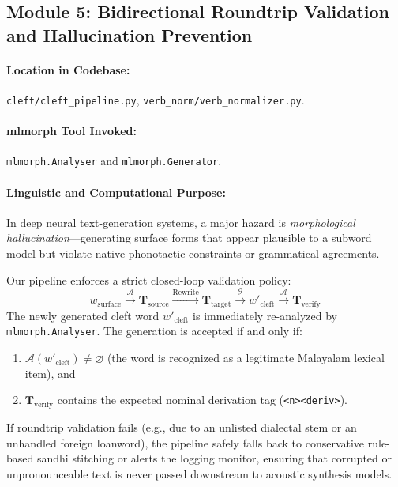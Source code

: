 \subsection{Module 5: Bidirectional Roundtrip Validation and Hallucination Prevention}
\label{subsec:mod5_validation}

\paragraph{Location in Codebase:} \texttt{cleft/cleft\_pipeline.py}, \texttt{verb\_norm/verb\_normalizer.py}.
\paragraph{mlmorph Tool Invoked:} \texttt{mlmorph.Analyser} and \texttt{mlmorph.Generator}.

\paragraph{Linguistic and Computational Purpose:}
In deep neural text-generation systems, a major hazard is \textit{morphological hallucination}—generating surface forms that appear plausible to a subword model but violate native phonotactic constraints or grammatical agreements. 

Our pipeline enforces a strict closed-loop validation policy:
\begin{equation}
    w_{\text{surface}} \xrightarrow{\mathcal{A}} \mathbf{T}_{\text{source}} \xrightarrow{\text{Rewrite}} \mathbf{T}_{\text{target}} \xrightarrow{\mathcal{G}} w'_{\text{cleft}} \xrightarrow{\mathcal{A}} \mathbf{T}_{\text{verify}}
\end{equation}
The newly generated cleft word $w'_{\text{cleft}}$ is immediately re-analyzed by \texttt{mlmorph.Analyser}. The generation is accepted if and only if:
\begin{enumerate}[noitemsep]
    \item $\mathcal{A}(w'_{\text{cleft}}) \neq \varnothing$ (the word is recognized as a legitimate Malayalam lexical item), and
    \item $\mathbf{T}_{\text{verify}}$ contains the expected nominal derivation tag (\texttt{<n><deriv>}).
\end{enumerate}
If roundtrip validation fails (e.g., due to an unlisted dialectal stem or an unhandled foreign loanword), the pipeline safely falls back to conservative rule-based sandhi stitching or alerts the logging monitor, ensuring that corrupted or unpronounceable text is never passed downstream to acoustic synthesis models.

